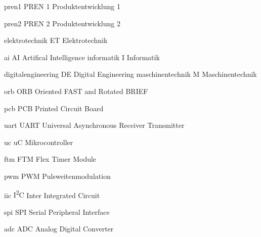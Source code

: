 \newacronym
  {pren1}                 %
  {PREN 1}                %
  {Produktentwicklung 1}  %

\newacronym
  {pren2}                 %
  {PREN 2}                %
  {Produktentwicklung 2}  %

\newacronym
  {elektrotechnik}                    %
  {ET}                    %
  {Elektrotechnik}        %

\newacronym
  {ai}                    %
  {AI}                    %
  {Artifical Intelligence}        %
\newacronym
  {informatik}             %
  {I}                      %
  {Informatik}   
  
\newacronym
  {digitalengineering}             %
  {DE}                      %
  {Digital Engineering}  
\newacronym
  {maschinentechnik}       %
  {M}                      %
  {Maschinentechnik}       %

\newacronym
  {orb}                                    %
  {ORB}                                    %
  {Oriented FAST and Rotated BRIEF}        %

\newacronym
  {pcb}                         %
  {PCB}                         %
  {Printed Circuit Board}       %

\newacronym
  {uart}       %
  {UART}                      %
  {Universal Asynchronous Receiver Transmitter}       %

\newacronym
  {uc}       %
  {uC}                      %
  {Mikrocontroller}       %

\newacronym
  {ftm}       %
  {FTM}                      %
  {Flex Timer Module}       %

\newacronym
  {pwm}                 %
  {PWM}                %
  {Pulsweitenmodulation}  %

\newacronym
  {iic}                 %
  {I\textsuperscript{2}C}     %
  {Inter Integrated Circuit}  %


\newacronym
  {spi}                 %
  {SPI}                %
  {Serial Peripheral Interface}  %

\newacronym
  {adc}                 %
  {ADC}                %
  {Analog Digital Converter}  %

